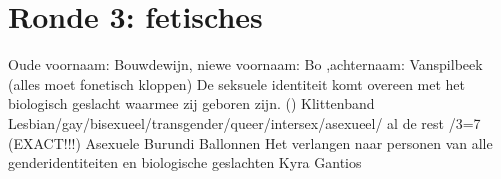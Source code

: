 
\section{Ronde 3: fetisches}
\begin{questions}

\question[2] Oude voornaam: Bouwdewijn, niewe voornaam: Bo ,achternaam: Vanspilbeek (alles moet fonetisch kloppen)
\vspace{5mm}
\question[2] De seksuele identiteit komt overeen met het biologisch geslacht waarmee zij geboren zijn. ()
\vspace{5mm}
\question[2] Klittenband
\vspace{5mm}
\question[2] Lesbian/gay/bisexueel/transgender/queer/intersex/asexueel/ al de rest
\vspace{5mm}
/3=7 (EXACT!!!)
\vspace{5mm}
\question[2] Asexuele
\vspace{5mm}
\question[2] Burundi
\vspace{5mm}
\question[2] Ballonnen
\vspace{5mm}
\question[2] Het verlangen naar personen van alle genderidentiteiten en biologische geslachten
\vspace{5mm}
\question[2] Kyra Gantios

\end{questions}
\newpage
